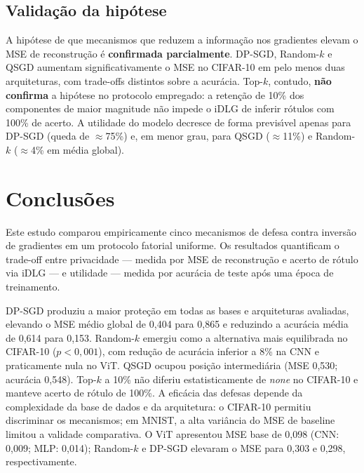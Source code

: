 \documentclass[kdmile,a4paper]{kdmile}
\begin{document}
\subsection{Valida\c{c}\~{a}o da hip\'{o}tese}

A hip\'{o}tese de que mecanismos que reduzem a informa\c{c}\~{a}o nos gradientes elevam o MSE de reconstru\c{c}\~{a}o \'{e} \textbf{confirmada parcialmente}. DP-SGD, Random-$k$ e QSGD aumentam significativamente o MSE no CIFAR-10 em pelo menos duas arquiteturas, com trade-offs distintos sobre a acur\'{a}cia. Top-$k$, contudo, \textbf{n\~{a}o confirma} a hip\'{o}tese no protocolo empregado: a reten\c{c}\~{a}o de 10\% dos componentes de maior magnitude n\~{a}o impede o iDLG de inferir r\'{o}tulos com 100\% de acerto. A utilidade do modelo decresce de forma previs\'{\i}vel apenas para DP-SGD (queda de $\approx$75\%) e, em menor grau, para QSGD ($\approx$11\%) e Random-$k$ ($\approx$4\% em m\'{e}dia global).

\section{Conclus\~{o}es}
\label{sec:conclusoes}

Este estudo comparou empiricamente cinco mecanismos de defesa contra invers\~{a}o de gradientes em um protocolo fatorial uniforme. Os resultados quantificam o trade-off entre privacidade --- medida por MSE de reconstru\c{c}\~{a}o e acerto de r\'{o}tulo via iDLG --- e utilidade --- medida por acur\'{a}cia de teste ap\'{o}s uma \'{e}poca de treinamento.

DP-SGD produziu a maior prote\c{c}\~{a}o em todas as bases e arquiteturas avaliadas, elevando o MSE m\'{e}dio global de 0,404 para 0,865 e reduzindo a acur\'{a}cia m\'{e}dia de 0,614 para 0,153. Random-$k$ emergiu como a alternativa mais equilibrada no CIFAR-10 ($p < 0{,}001$), com redu\c{c}\~{a}o de acur\'{a}cia inferior a 8\% na CNN e praticamente nula no ViT. QSGD ocupou posi\c{c}\~{a}o intermedi\'{a}ria (MSE 0,530; acur\'{a}cia 0,548). Top-$k$ a 10\% n\~{a}o diferiu estatisticamente de \textit{none} no CIFAR-10 e manteve acerto de r\'{o}tulo de 100\%. A efic\'{a}cia das defesas depende da complexidade da base de dados e da arquitetura: o CIFAR-10 permitiu discriminar os mecanismos; em MNIST, a alta vari\^{a}ncia do MSE de baseline limitou a validade comparativa. O ViT apresentou MSE base de 0,098 (CNN: 0,009; MLP: 0,014); Random-$k$ e DP-SGD elevaram o MSE para 0,303 e 0,298, respectivamente.
\end{document}
